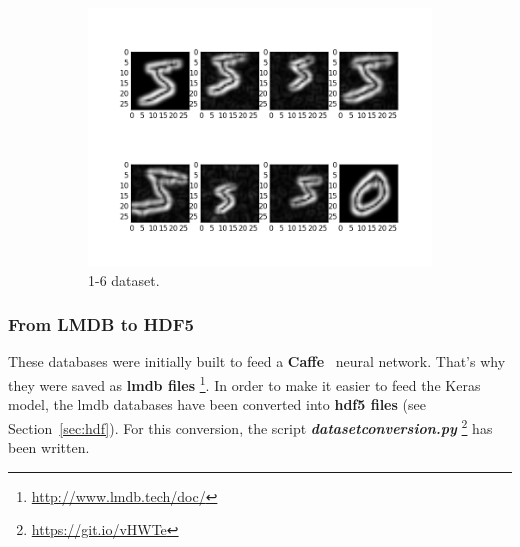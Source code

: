 \begin{figure}
\begin{subfigure}{0.5\textwidth}
		\includegraphics[width=1\linewidth]{figures/1-6.png}
		\caption{1-6 dataset.}\label{fig:1-6}
	\end{subfigure}
	\caption[First samples of handmade datasets.]{}
	\label{fig:aug_nuria}
\end{figure}

\subsubsection{From LMDB to HDF5} \label{subsubsec:lmdb2hdf5}
These databases were initially built to feed a \textbf{Caffe}~\cite{jia2014caffe} neural network. That's why they were saved as \textbf{\gls{lmdb} files} \footnote{\url{http://www.lmdb.tech/doc/}}. In order to make it easier to feed the Keras model, the \gls{lmdb} databases have been converted into \textbf{\gls{hdf5} files} (see Section~\ref{sec:hdf}). For this conversion, the script \textbf{\textit{datasetconversion.py}} \footnote{\url{https://git.io/vHWTe}} has been written.

